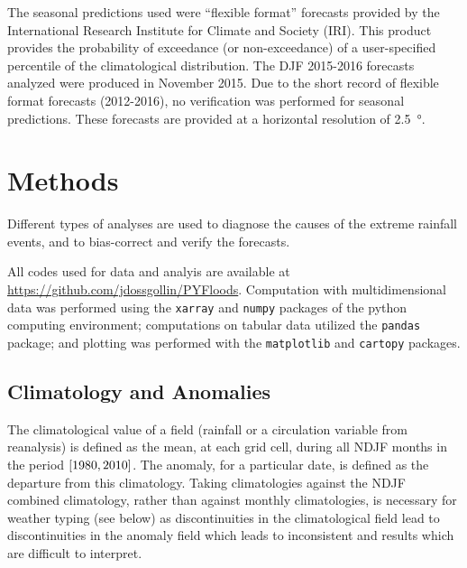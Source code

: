 \documentclass[twocol]{ametsoc}
\begin{document}
The seasonal predictions used were ``flexible format'' forecasts provided by the International Research Institute for Climate and Society (IRI).
This product provides the probability of exceedance (or non-exceedance) of a user-specified percentile of the climatological distribution.
The DJF 2015-2016 forecasts analyzed were produced in November 2015.
Due to the short record of flexible format forecasts (2012-2016), no verification was performed for seasonal predictions.
These forecasts are provided at a horizontal resolution of \SI{2.5}{\degree}.



\section{Methods} \label{sec:methods}

Different types of analyses are used to diagnose the causes of the extreme rainfall events, and to bias-correct and verify the forecasts.

All codes used for data and analyis are available at \url{https://github.com/jdossgollin/PYFloods}.
Computation with multidimensional data was performed using the \texttt{xarray} \citep{hoyer2017xarray} and \texttt{numpy} \citep{vanderWalt:2011dp} packages of the python computing environment; computations on tabular data utilized the \texttt{pandas} \citep{McKinney:2010un} package; and plotting was performed with the \texttt{matplotlib} \citep{Hunter:2007ux} and \texttt{cartopy} \citep{Cartopy} packages.

\subsection{Climatology and Anomalies} \label{sec:climatology-anomalies}

The climatological value of a field (rainfall or a circulation variable from reanalysis) is defined as the mean, at each grid cell, during all NDJF months in the period $\qty[1980, 2010]$.
The anomaly, for a particular date, is defined as the departure from this climatology.
Taking climatologies against the NDJF combined climatology, rather than against monthly climatologies, is necessary for weather typing (see below) as discontinuities in the climatological field lead to discontinuities in the anomaly field which leads to inconsistent and results which are difficult to interpret.
\end{document}
